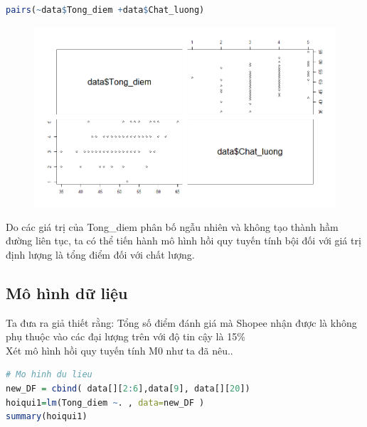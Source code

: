 \documentclass[a4paper]{article}
\theoremstyle{definition}
\begin{document}
\begin{itemize}
\begin{itemize}
\begin{enumerate}
        
    \begin{lstlisting}[language=R, caption=Làm rõ dữ liệu]
pairs(~data$Tong_diem +data$Chat_luong)
\end{lstlisting}
\begin{figure}[H]
            \centering
            \includegraphics[scale=0.5]{6.png}
            \label{fig:my_label}
        \end{figure}



Do các giá trị của Tong\_diem phân bố ngẫu nhiên và không tạo thành hầm đường liên tục, ta có thể tiến hành mô hình hồi quy tuyến tính bội đối với giá trị định lượng là tổng điểm đối với chất lượng.\\
\end{enumerate}
    \end{itemize}
\subsection{Mô hình dữ liệu}
\begin{itemize}
Ta đưa ra giả thiết rằng: Tổng số điểm đánh giá mà Shopee nhận được là không phụ thuộc vào các đại lượng trên với độ tin cậy là 15\%\\
Xét mô hình hồi quy tuyến tính M0 như ta đã nêu..\\
    \begin{lstlisting}[language=R, caption=Mô hình dữ liệu]
# Mo hinh du lieu
new_DF = cbind( data[][2:6],data[9], data[][20])
hoiqui1=lm(Tong_diem ~. , data=new_DF )
summary(hoiqui1)
  

\end{lstlisting}
\end{itemize}
\end{itemize}
\end{document}

